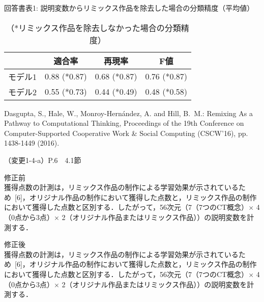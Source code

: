 \documentclass{jarticle} %
\def\subsection#1{ \vspace{1pc} {\gt #1} }
\begin{document}
\vspace{0.5cm}
\begin{table}[h]
        \begin{center}
        \captionsetup{labelformat=empty,labelsep=none}
        \caption{回答書表1: 説明変数からリミックス作品を除去した場合の分類精度（平均値）}
        \vspace{-0.4cm}
        \caption{（*リミックス作品を除去しなかった場合の分類精度）}
	 \vspace{-0.3cm}
            \begin{tabular}{l|p{30mm}|p{30mm}|p{30mm}}
                \hline
                & \multicolumn{1}{c|}{適合率} & \multicolumn{1}{c|}{再現率} & \multicolumn{1}{c}{F値} \\ \hline
                モデル1 & 0.88 (*0.87) & 0.68 (*0.87) & 0.76 (*0.87) \\
                モデル2 & 0.55 (*0.73) & 0.44 (*0.49) & 0.48 (*0.58) \\ 
                \hline
            \end{tabular}
        \end{center}
        \label{tab:predict_result}
\end{table}

\noindent[回答書引用2] Dasgupta, S., Hale, W., Monroy-Hern\'{a}ndez, A. and Hill, B.~M.: Remixing As a Pathway to Computational Thinking, Proceedings of the 19th Conference on Computer-Supported Cooperative Work \& Social Computing (CSCW'16), pp. 1438-1449 (2016).

\newpage
\subsection{（変更1-4-a）P.6　4.1節}
\vspace{-0.3cm}
\begin{description}
\item 修正前\\
\phantom{　}
獲得点数の計測は，リミックス作品の制作による学習効果が示されているため~[6]，オリジナル作品の制作において獲得した点数と，リミックス作品の制作において獲得した点数と区別する．したがって，56次元（7（7つのCT概念）{$\times$} 4（0点から3点）{$\times$} 2（オリジナル作品またはリミックス作品））の説明変数を計測する．
\vspace{-0.3cm}
\item 修正後\\
\phantom{　}
獲得点数の計測は，リミックス作品の制作による学習効果が示されているため~[6]，オリジナル作品の制作において獲得した点数と，リミックス作品の制作において獲得した点数と区別する．したがって，56次元（7（7つのCT概念）{$\times$} 4（0点から3点）{$\times$} 2（オリジナル作品またはリミックス作品））の説明変数を計測する．\textcolor{red}{}
\end{description}
\end{document}
